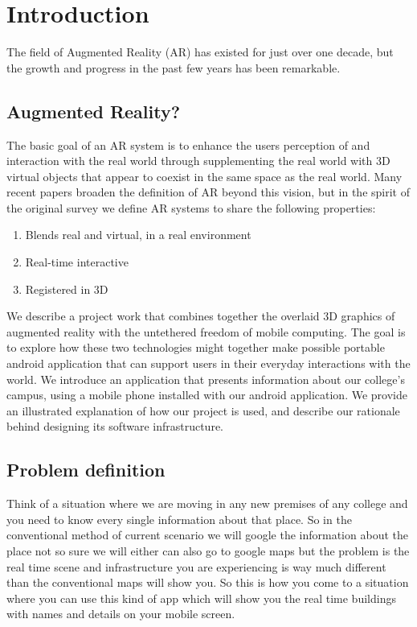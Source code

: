 \documentclass{article}
\begin{document}
\newpage
\large
\section{Introduction}
\par The field of Augmented Reality (AR) has existed for just over one decade, but the growth and progress in the past few years has been remarkable. 
\subsection{Augmented Reality?}
\par The basic goal of an AR system is to enhance the users perception of and interaction with the real world through supplementing the real world with 3D virtual objects that appear to coexist in the same space as the real world.  Many recent papers broaden the definition of AR beyond this vision, but in the spirit of the original survey we define AR systems to share the following properties: 

\begin{enumerate}
\item  Blends real and virtual, in a real environment 
\item  Real-time interactive 
\item  Registered in 3D 
\end{enumerate}

\par We describe a project work that combines together the overlaid 3D graphics of augmented reality with the untethered freedom of mobile computing. The goal is to explore how these two technologies might together make possible portable android application that can support users in their everyday interactions with the world. We introduce an application that presents information about our college’s campus, using a mobile phone installed with our android application. We provide an illustrated explanation of how our project is used, and describe our rationale behind designing its software infrastructure. \\


\subsection{Problem definition}
\par Think of a situation where we are moving in any new premises of any college and you need to know every single information about that place. So in the conventional method of current scenario we will google the information about the place not so sure we will either can also go to google maps but the problem is the real time scene and infrastructure you are experiencing is way much different than the conventional maps will show you. So this is how you come to a situation where you can use this kind of app which will show you the real time buildings with names and details on your mobile screen.
\end{document}

